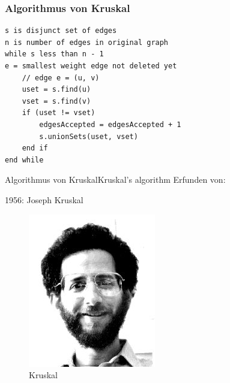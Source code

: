 \begin{frame}[fragile]
\frametitle{Algorithmus von Kruskal}
\begin{lstlisting}
s is disjunct set of edges
n is number of edges in original graph
while s less than n - 1
e = smallest weight edge not deleted yet
    // edge e = (u, v)
    uset = s.find(u)
    vset = s.find(v)
    if (uset != vset)
        edgesAccepted = edgesAccepted + 1
        s.unionSets(uset, vset)
    end if
end while
\end{lstlisting}
\end{frame}

\begin{frame}{Algorithmus von Kruskal}{Kruskal's algorithm}
	Erfunden von:
	
	1956: Joseph Kruskal
	
	\begin{figure}
		\includegraphics[scale=0.6]{Material/kruskal.jpg}
		\caption{Kruskal}
	\end{figure}
\end{frame}
